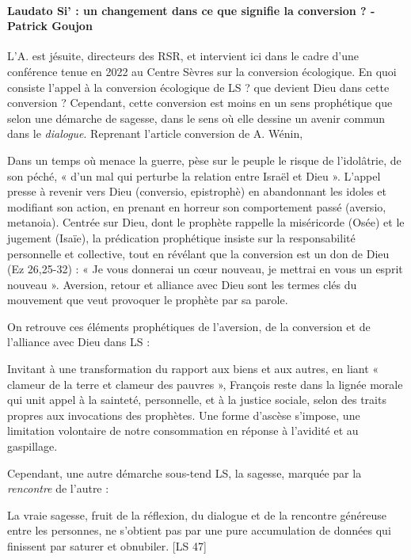 \paragraph{Laudato Si’ : un changement dans ce que signifie la conversion ? - Patrick Goujon} \cite{goujon_laudato_2022} L'A. est jésuite, directeurs des RSR, et intervient ici dans le cadre d'une conférence tenue en 2022 au Centre Sèvres sur la conversion écologique. En quoi consiste l'appel à la conversion écologique de LS ? que devient Dieu dans cette conversion ? Cependant, cette conversion est moins en un sens prophétique que selon une démarche de sagesse, dans le sens où elle dessine un avenir commun dans le \textit{dialogue}. 
Reprenant l'article conversion \cite{lacoste_conversion_2007} de A. Wénin, 
\begin{singlequote}
    Dans un temps où menace la guerre, pèse sur le peuple le risque de l’idolâtrie, de son péché, « d’un mal qui perturbe la relation entre Israël et Dieu ». L’appel presse à revenir vers Dieu (conversio, epistrophè) en abandonnant les idoles et modifiant son action, en prenant en horreur son comportement passé (aversio, metanoia). Centrée sur Dieu, dont le prophète rappelle la miséricorde (Osée) et le jugement (Isaïe), la prédication prophétique insiste sur la responsabilité personnelle et collective, tout en révélant que la conversion est un don de Dieu (Ez 26,25-32) : « Je vous donnerai un cœur nouveau, je mettrai en vous un esprit nouveau ». Aversion, retour et alliance avec Dieu sont les termes clés du mouvement que veut provoquer le prophète par sa parole. \cite[p. 392]{goujon_laudato_2022}
\end{singlequote}

On retrouve ces éléments prophétiques de l'aversion, de la conversion et de l'alliance avec Dieu dans LS : 
\begin{singlequote}
     Invitant à une transformation du rapport aux biens et aux autres, en liant « clameur de la terre et clameur des pauvres », François reste dans la lignée morale qui unit appel à la sainteté, personnelle, et à la justice sociale, selon des traits propres aux invocations des prophètes. Une forme d’ascèse s’impose, une limitation volontaire de notre consommation en réponse à l’avidité et au gaspillage.\cite[p. 393]{goujon_laudato_2022}
\end{singlequote}

Cependant, une autre démarche sous-tend LS, la sagesse, marquée par la \textit{rencontre} de l'autre : 
\begin{singlequote}
     La vraie sagesse, fruit de la réflexion, du dialogue et de la rencontre généreuse entre les personnes, ne s’obtient pas par une pure accumulation de données qui finissent par saturer et obnubiler.  [LS 47]
\end{singlequote}





